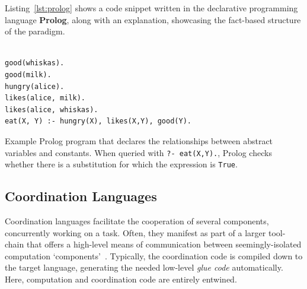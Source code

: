 Listing~\ref{lst:prolog} shows a code snippet written in the declarative programming language \textbf{Prolog}, along with an explanation, showcasing the fact-based structure of the paradigm.
\begin{listing}[t!]
\footnotesize
\begin{verbatim}

good(whiskas).
good(milk).
hungry(alice).
likes(alice, milk).
likes(alice, whiskas).
eat(X, Y) :- hungry(X), likes(X,Y), good(Y). 

\end{verbatim}
\caption{Example Prolog program that declares the relationships between abstract variables and constants. When queried with \texttt{?- eat(X,Y).}, Prolog checks whether there is a substitution for which the expression is \texttt{True}.}
\label{lst:prolog}
\end{listing}






\subsection{Coordination Languages}

Coordination languages facilitate the cooperation of several components, concurrently working on a task. Often, they manifest as part of a larger tool-chain that offers a high-level means of communication between seemingly-isolated computation `components'~\cite{coordination}. Typically, the coordination code is compiled down to the target language, generating the needed low-level \textit{glue code} automatically. Here, computation and coordination code are entirely entwined.

